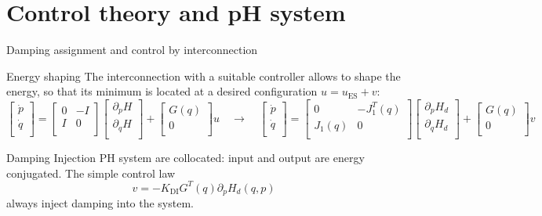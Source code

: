\documentclass[aspectratio=169]{ISAE-Beamer}
\begin{document}
\section{Control theory and pH system}

\begin{frame}{Damping assignment and control by interconnection}

\begin{block}{Energy shaping}
	The interconnection with a suitable controller allows to shape the energy, so that its minimum is located at a desired configuration $u = u_{\text{ES}} + v$:
	\begin{equation*}
	\begin{bmatrix}
	\dot{p} \\ \dot{q} \\
	\end{bmatrix} = 
	\begin{bmatrix}
	0 & -I \\ 
	I & 0 \\
	\end{bmatrix}
	\begin{bmatrix}
	\partial_p{H} \\ 
	\partial_q{H} \\
	\end{bmatrix}+ 
	\begin{bmatrix}
	G(q) \\ 0 \\
	\end{bmatrix} u 
	\quad \longrightarrow \quad
	\begin{bmatrix}
	\dot{p} \\ \dot{q} \\
	\end{bmatrix} = 
	\begin{bmatrix}
	0 & -J_1^T(q) \\ 
	J_1(q) & 0 \\
	\end{bmatrix}
	\begin{bmatrix}
	\partial_p{H_d} \\ 
	\partial_q{H_d} \\
	\end{bmatrix} + 
	\begin{bmatrix}
	G(q) \\ 0 \\
	\end{bmatrix} v
	\end{equation*}
\end{block}

\begin{exampleblock}{Damping Injection}
PH system are collocated: input and output are energy conjugated. The simple control law 
\[v= - K_{\text{DI}} G^T(q) \partial_p H_d(q, p) \]
 always inject damping into the system.
\end{exampleblock}
\end{frame}
\end{document}
